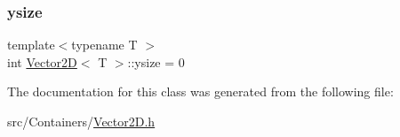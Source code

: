 \subsubsection{\texorpdfstring{ysize}{ysize}}
{\footnotesize\ttfamily template$<$typename T $>$ \\
int \hyperlink{struct_vector2_d}{Vector2D}$<$ T $>$\+::ysize = 0}



The documentation for this class was generated from the following file\+:\begin{DoxyCompactItemize}
\item 
src/\+Containers/\hyperlink{_vector2_d_8h}{Vector2\+D.\+h}\end{DoxyCompactItemize}
